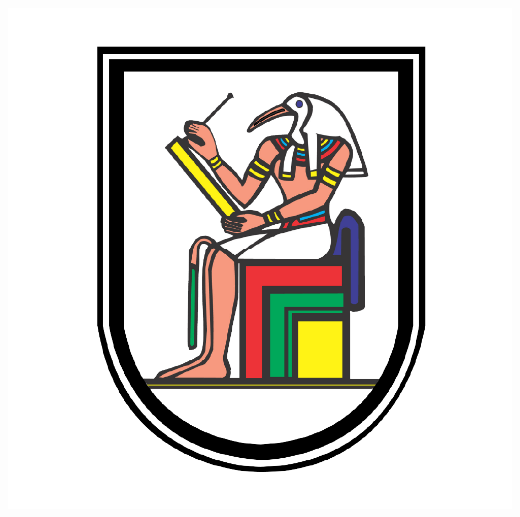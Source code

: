 \documentclass[12pt]{article}
\theoremstyle{plain}
\theoremstyle{definition}
\begin{document}
\begin{titlepage}
	
	
	\includegraphics[scale=0.15]{cu_logo.png}\\[1cm] %
	 
	
	\vfill %
	
\end{titlepage}
    
    
    
\end{document}

